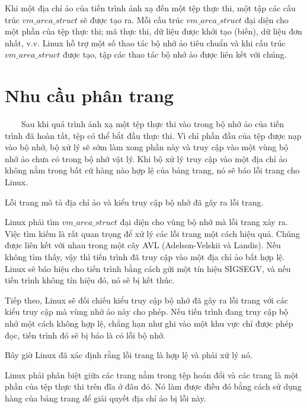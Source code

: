 \documentclass{article}
\begin{document}
Khi một địa chỉ ảo của tiến trình ánh xạ đến một tệp thực thi, một tập các cấu trúc $vm\_area\_struct$ sẽ được tạo ra. Mỗi cấu trúc $vm\_area\_struct$ đại diện cho một phần của tệp thực thi; mã thực thi, dữ liệu được khởi tạo (biến), dữ liệu đơn nhất, v.v. Linux hỗ trợ một số thao tác bộ nhớ ảo tiêu chuẩn và khi cấu trúc $vm\_area\_struct$ được tạo, tập các thao tác bộ nhớ ảo được liên kết với chúng.

\section{Nhu cầu phân trang}

~~~~Sau khi quá trình ánh xạ một tệp thực thi vào trong bộ nhớ ảo của tiến trình đã hoàn tất, tệp có thể bắt đầu thực thi. Vì chỉ phần đầu của tệp được nạp vào bộ nhớ, bộ xử lý sẽ sớm làm xong phần này và truy cập vào một vùng bộ nhớ ảo chưa có trong bộ nhớ vật lý. Khi bộ xử lý truy cập vào một địa chỉ ảo không nằm trong bất cứ hàng nào hợp lệ của bảng trang, nó sẽ báo lỗi trang cho Linux.\vspace{1em}

Lỗi trang mô tả địa chỉ ảo và kiểu truy cập bộ nhớ đã gây ra lỗi trang.\vspace{1em}

Linux phải tìm $vm\_area\_struct$ đại diện cho vùng bộ nhớ mà lỗi trang xảy ra. Việc tìm kiếm là rất quan trọng để xử lý các lỗi trang một cách hiệu quả. Chúng được liên kết với nhau trong một cây AVL (Adelson-Velskii và Landis). Nếu không tìm thấy, vậy thì tiến trình đã truy cập vào một địa chỉ ảo bất hợp lệ. Linux sẽ báo hiệu cho tiến trình bằng cách gửi một tín hiệu SIGSEGV, và nếu tiến trình không tín hiệu đó, nó sẽ bị kết thúc.\vspace{1em}

Tiếp theo, Linux sẽ đối chiếu kiểu truy cập bộ nhớ đã gây ra lỗi trang với các kiểu truy cập mà vùng nhớ ảo này cho phép. Nếu tiến trình đang truy cập bộ nhớ một cách không hợp lệ, chẳng hạn như ghi vào một khu vực chỉ được phép đọc, tiến trình đó sẽ bị báo là có lỗi bộ nhớ.\vspace{1em}

Bây giờ Linux đã xác định rằng lỗi trang là hợp lệ và phải xử lý nó.\vspace{1em}

Linux phải phân biệt giữa các trang nằm trong tệp hoán đổi và các trang là một phần của tệp thực thi trên đĩa ở đâu đó. Nó làm được điều đó bằng cách sử dụng hàng của bảng trang để giải quyết địa chỉ ảo bị lỗi này.\vspace{1em}
\end{document}
